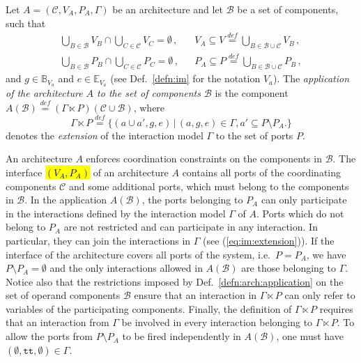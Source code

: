 \documentclass{llncs}
\newcommand{\todoSBin}[2][inline,color=green!40]{\todo[#1]{\textbf{To-do Simon: } {#2}}}
\newcommand{\defn}[1]{Def.~\ref{defn:#1}}
\newcommand{\eq}[1]{(\ref{eq:#1})}
\newcommand{\cB}{\ensuremath{\mathcal{B}}}
\newcommand{\sB}{\ensuremath{\mathbb{B}}}
\newcommand{\cC}{\ensuremath{\mathcal{C}}}
\newcommand{\sE}{\ensuremath{\mathbb{E}}}
\newcommand{\ie}[1][\ ]{i.e.#1}
\newcommand{\bydef}[1]{\ensuremath{\stackrel{\mathit{\scriptscriptstyle def}}{#1}}}
\newcommand{\setdefb}[2]{\ensuremath{\bigl\{{#1}\,\bigl|\,{#2}\bigr.\bigr\}}}
\newcommand{\true} {\ensuremath{\mathtt{t\!t}}}
\newcommand{\noop} {\ensuremath{\emptyset}} %
\newcommand{\guards}[1]{\ensuremath{\sB_{#1}}}
\newcommand{\exprs}[1]{\ensuremath{\sE_{#1}}}
\newcommand{\export}[1][]{\ensuremath{\varepsilon_{#1}}}
\newcommand{\supp}[1]{\ensuremath{\mathrm{supp}(#1)}}
\newcommand{\IMextend}[2]{\ensuremath{#1 \ltimes #2}}
\newcommand{\arequiv}{\equiv}
\begin{document}
\begin{definition}
  \label{defn:arch:application}
  Let $A = (\cC, V_A, P_A, \Gamma)$ be an architecture and let $\cB$
  be a set of components, such that
%
  \begin{align}
    \bigcup_{B \in \cB} V_B \cap \bigcup_{C \in \cC} V_C = \emptyset\,,
    &&
    V_A \subseteq V \bydef{=} \bigcup_{B \in \cB \cup \cC} V_B\,,
    \\
    \bigcup_{B \in \cB} P_B \cap \bigcup_{C \in \cC} P_C = \emptyset\,,
    &&
    P_A \subseteq P \bydef{=} \bigcup_{B \in \cB \cup \cC} P_B\,,
  \end{align}
%
  and
  $g \in \guards{V_a}$ and
  $e \in \exprs{V_a}$ (see \defn{im} for the notation $V_a$).
%
  The \emph{application of the architecture $A$ to the set of
  components $\cB$} is the component $ A(\cB) \bydef{=}
  (\IMextend{\Gamma}{P})(\cC \cup \cB)$, where
%
  \begin{equation}
    \label{eq:im:extension}
    \IMextend{\Gamma}{P} \bydef{=}
    \setdefb{
      (a \cup a', g, e)
    }{
      (a, g, e) \in \Gamma, a' \subseteq P \setminus P_A
    }
  \end{equation}
%
  denotes the \emph{extension} of the interaction model $\Gamma$
  to the set of ports $P$.
\end{definition}

\todoSBin{Define equivalence $\arequiv$?}

An architecture $A$ enforces coordination constraints on the
components in $\cB$.  The interface \hl{$(V_A, P_A)$} of an
architecture $A$ contains all ports of the coordinating
components $\cC$ and some additional ports, which must belong to
the components in $\cB$.  In the application $A(\cB)$, the ports
belonging to $P_A$ can only participate in the interactions
defined by the interaction model $\Gamma$ of $A$.  Ports which do
not belong to $P_A$ are not restricted and can participate in any
interaction.  In particular, they can join the interactions in
$\Gamma$ (see \eq{im:extension}).  If the interface of the
architecture covers all ports of the system, \ie $P = P_A$, we
have $P\setminus P_A = \emptyset$ and the only interactions
allowed in $A(\cB)$ are those belonging to $\Gamma$.  Notice also
that the restrictions imposed by \defn{arch:application} on the
set of operand components $\cB$ ensure that an interaction in
$\IMextend{\Gamma}{P}$ can only refer to variables of the
participating components.
%
Finally, the definition of $\IMextend{\Gamma}{P}$ requires that
an interaction from $\Gamma$ be involved in every interaction
belonging to $\IMextend{\Gamma}{P}$.  To allow the ports from $P
\setminus P_A$ to be fired independently in $A(\cB)$, one must
have $(\emptyset, \true, \noop) \in \Gamma$.  
\end{document}
